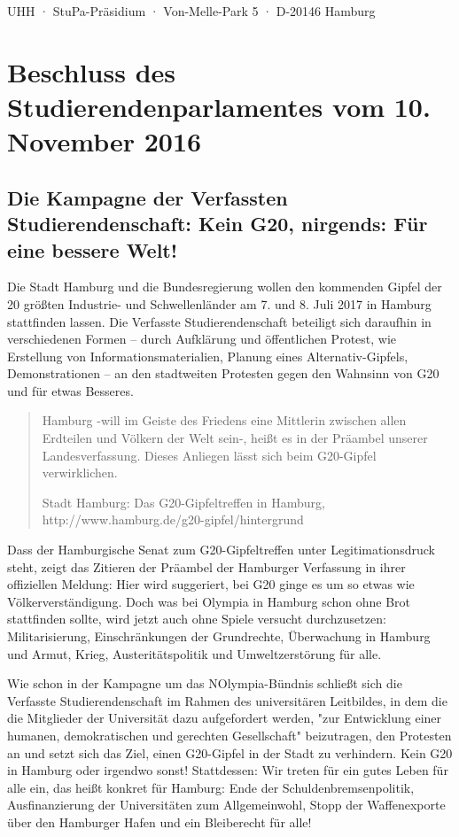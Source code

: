 \documentclass[ngerman,headheight=70pt]{scrartcl}
\begin{document}
    UHH · StuPa-Präsidium · Von-Melle-Park 5 · D-20146 Hamburg

    \section*{Beschluss des Studierendenparlamentes vom 10. November 2016}
    \subsection*{Die Kampagne der Verfassten Studierendenschaft:
    Kein G20, nirgends: Für eine bessere Welt!}

    Die Stadt Hamburg und die Bundesregierung wollen den kommenden Gipfel der
    20 größten Industrie- und Schwellenländer am 7. und 8. Juli 2017 in Hamburg
    stattfinden lassen. Die Verfasste Studierendenschaft beteiligt sich
    daraufhin in verschiedenen Formen -- durch Aufklärung und öffentlichen Protest,
    wie Erstellung von Informationsmaterialien, Planung eines Alternativ-Gipfels,
    Demonstrationen -- an den stadtweiten Protesten gegen den Wahnsinn von G20
    und für etwas Besseres.

    \blockquote[Stadt Hamburg: Das G20-Gipfeltreffen in Hamburg, http://www.hamburg.de/g20-gipfel/hintergrund]{
    Hamburg -will im Geiste des Friedens eine Mittlerin zwischen
    allen Erdteilen und Völkern der Welt sein-, heißt es in der Präambel unserer
    Landesverfassung. Dieses Anliegen lässt sich beim G20-Gipfel verwirklichen.}

    Dass der Hamburgische Senat zum G20-Gipfeltreffen unter Legitimationsdruck
    steht, zeigt das Zitieren der Präambel der Hamburger Verfassung in ihrer
    offiziellen Meldung: Hier wird suggeriert, bei G20 ginge es um so etwas wie
    Völkerverständigung. Doch was bei Olympia in Hamburg schon ohne Brot
    stattfinden sollte, wird jetzt auch ohne Spiele versucht durchzusetzen:
    Militarisierung, Einschränkungen der Grundrechte, Überwachung in Hamburg und
    Armut, Krieg, Austeritätspolitik und Umweltzerstörung für alle.

    Wie schon in der Kampagne um das NOlympia-Bündnis schließt sich die Verfasste
    Studierendenschaft im Rahmen des universitären Leitbildes, in dem die die
    Mitglieder der Universität dazu aufgefordert werden, "zur Entwicklung einer
    humanen, demokratischen und gerechten Gesellschaft" beizutragen, den Protesten
    an und setzt sich das Ziel, einen G20-Gipfel in der Stadt zu verhindern. Kein
    G20 in Hamburg oder irgendwo sonst! Stattdessen: Wir treten für ein gutes
    Leben für alle ein, das heißt konkret für Hamburg: Ende der
    Schuldenbremsenpolitik, Ausfinanzierung der Universitäten zum Allgemeinwohl,
    Stopp der Waffenexporte über den Hamburger Hafen und ein Bleiberecht für alle!
\end{document}
